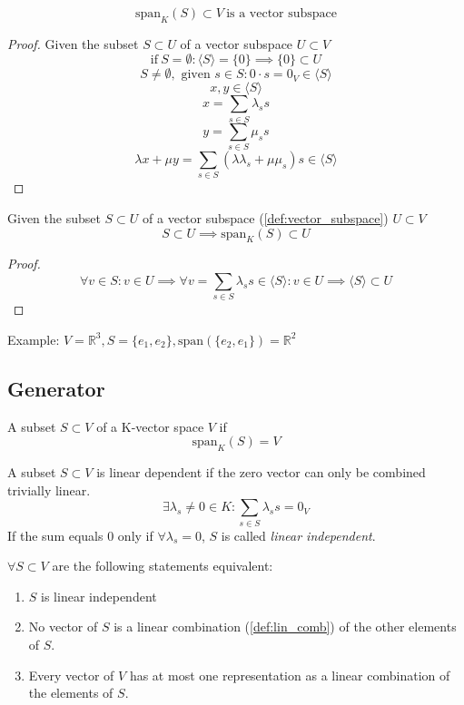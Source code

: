 \begin{proposition}[Span = Subspace]
   \[\text{span}_{K}(S) \subset V~\text{is a vector subspace}\]
\end{proposition}
\begin{proof}
   Given the subset \(S \subset U\) of a vector subspace \(U \subset V\)
   \[\text{if}~S = \emptyset: \langle S\rangle = \{0\} \implies \{0\} \subset U\]
   \[S \neq \emptyset, \text{ given } s \in S: 0 \cdot s = 0_V \in \langle S\rangle\]
   \[x, y \in \langle S\rangle\]
   \[x = \sum_{s \in S} \lambda_s s\]
   \[y = \sum_{s \in S} \mu_s s\]
   \[\lambda x + \mu y = \sum_{s \in S} (\lambda \lambda_s + \mu \mu_s)s \in \langle S\rangle\]
\end{proof}

\begin{proposition}
   Given the subset \(S \subset U\) of a vector subspace (\ref{def:vector_subspace}) \(U \subset V\)
   \[S \subset U \implies \text{span}_{K}(S) \subset U\]
\end{proposition}
\begin{proof}
   \[\forall v \in S: v \in U \implies \forall v = \sum_{s \in S} \lambda_s s \in \langle S \rangle: v \in U \implies \langle S\rangle \subset U\]
\end{proof}
Example: \(V = \mathbb{R}^3, S = \{e_1, e_2\}, \text{span}(\{e_2, e_1\}) = \mathbb{R}^2\)

\subsection{Generator}
\begin{definition}[Generator]\label{def:generator}
   A subset \(S \subset V\) of a K-vector space \(V\) if
   \[\text{span}_{K}(S) = V\]
\end{definition}

\begin{definition}\label{def:lin_depend}
   A subset \(S \subset V\) is linear dependent if the zero vector can only be combined trivially linear.
   \[\exists \lambda_s \neq 0 \in K: \sum_{s \in S} \lambda_s s = 0_V\]
   If the sum equals 0 only if \(\forall \lambda_s = 0\), \(S\) is called \textit{linear independent}.
\end{definition}

\begin{proposition}
   \(\forall S \subset V\) are the following statements equivalent:
   \begin{enumerate}
      \item \(S\) is linear independent
      \item No vector of \(S\) is a linear combination (\ref{def:lin_comb}) of the other elements of \(S\).
      \item Every vector of \(V\) has at most one representation as a linear combination of the elements of \(S\).
   \end{enumerate}
\end{proposition}

